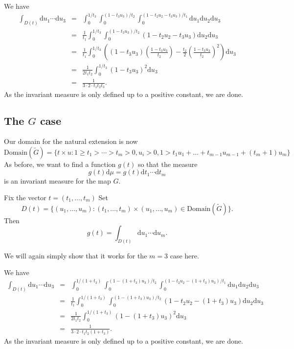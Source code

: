 \documentclass[12pt,oneside,openany]{article}
\begin{document}
We have
\begin{eqnarray*}
\int_{D(t)}  \mathrm{d} u_1 \cdots  \mathrm{d} u_3 &=& \int_0^{1/t_3}   \int_0^{(1-t_3u_3 )/t_2}
     \int_0^{(1-t_2u_2 - t_3 u_3)/t_1} \mathrm{d} u_1\mathrm{d} u_2 \mathrm{d} u_3 \\
     &=& \frac{1}{t_1 }    \int_0^{1/t_3}   \int_0^{(1-t_3u_3 )/t_2}
   (1-t_2u_2 - t_3 u_3)\mathrm{d} u_2 \mathrm{d} u_3    \\
   &=&  \frac{1}{t_1 }    \int_0^{1/t_3} \left( (1-t_3u_3) \left(    \frac{1-t_3 u_3}{t_2}   \right) - \frac{t_2}{2} \left(    \frac{1-t_3 u_3}{t_2}   \right)^2\right) \mathrm{d} u_3 \\
   &=& \frac{1}{2t_1t_2}  \int_0^{1/t_3} (1-t_3u_3)^2 \mathrm{d} u_3 \\
   &=& \frac{1}{3\cdot 2\cdot  t_1 t_2 t_3}.
   \end{eqnarray*}
   As the invariant measure is only defined up to a positive constant, we are done.
   
   
   \subsection{The $G$ case}
   
   Our domain for the natural extension is now 
   $$\mbox{Domain}(\tilde{G}) = \{ t \times u:1\geq t_1 >\cdots >t_m >0, u_i>0, 1> t_1u_1 + \ldots + t_{m-1} u_{m-1} + (t_m+1) u_m\}$$
   As before, we want  to find a function $g(t)$ so that the measure
$$g(t)\mathrm{d} \mu = g(t) \mathrm{d} t_1 \cdots  \mathrm{d} t_m$$
is an invariant measure for the map $G$.

   
   Fix the vector $t=(t_1, \ldots, t_m) $
   Set
   $$D(t) = \{ (u_1, \ldots, u_m) : (t_1, \ldots, t_m)\times (u_1, \ldots, u_m) \in \mbox{Domain}(\tilde{G}) \}.$$
   Then 
   $$g(t) =  \int_{D(t)}  \mathrm{d} u_1 \cdots  \mathrm{d} u_m.$$
   
   We will again simply show that it works for the $m=3$ case here.


We have
\begin{eqnarray*}
\int_{D(t)}  \mathrm{d} u_1 \cdots  \mathrm{d} u_3 &=& \int_0^{1/(1+t_3)}   \int_0^{(1-(1+t_3)u_3 )/t_2}
     \int_0^{(1-t_2u_2 - (1+t_3)u_3)/t_1} \mathrm{d} u_1\mathrm{d} u_2 \mathrm{d} u_3 \\
     &=& \frac{1}{t_1 }    \int_0^{1/(1+t_3)}   \int_0^{(1-(1+t_3)u_3 )/t_2}
   (1-t_2u_2 - (1+t_3) u_3)\mathrm{d} u_2 \mathrm{d} u_3    \\
   &=& \frac{1}{2t_1t_2}  \int_0^{1/(1+t_3)} (1-(1+ t_3)u_3)^2 \mathrm{d} u_3 \\
   &=& \frac{1}{3\cdot 2\cdot  t_1 t_2 (1+t_3)}.
   \end{eqnarray*}
   As the invariant measure is only defined up to a positive constant, we are done.
\end{document}
